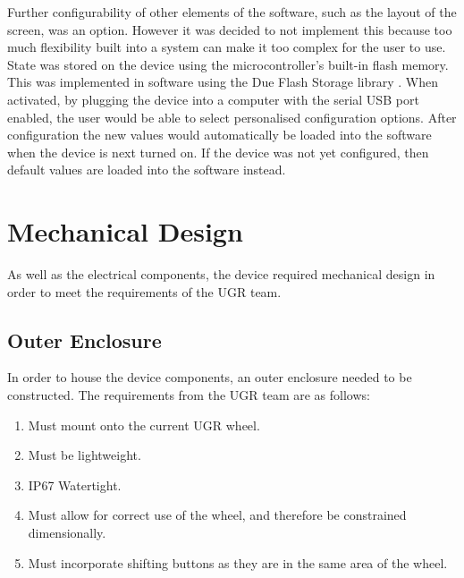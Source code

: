 \documentclass[a4paper,12pt]{article}
\begin{document}
Further configurability of other elements of the software, such as the layout of the screen, was an option. However it was decided to not implement this because too much flexibility built into a system can make it too complex for the user to use. \\



State was stored on the device using the microcontroller's built-in flash memory. This was implemented in software using the Due Flash Storage library \cite{due_flash_storage}. When activated, by plugging the device into a computer with the serial USB port enabled, the user would be able to select personalised configuration options. After configuration the new values would automatically be loaded into the software when the device is next turned on. If the device was not yet configured, then default values are loaded into the software instead.


\newpage
\section{Mechanical Design}
\label{sec:mechanical_design}

As well as the electrical components, the device required mechanical design in order to meet the requirements of the UGR team.

\subsection{Outer Enclosure}
\label{sec:outer_enclosure}

In order to house the device components, an outer enclosure needed to be constructed. The requirements from the UGR team are as follows:

\begin{enumerate}
  \item Must mount onto the current UGR wheel.
  \item Must be lightweight.
  \item IP67 Watertight.
  \item Must allow for correct use of the wheel, and therefore be constrained dimensionally.
  \item Must incorporate shifting buttons as they are in the same area of the wheel.
\end{enumerate}
\end{document}
